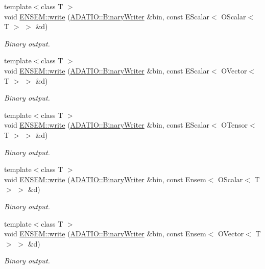 \begin{DoxyCompactItemize}
{\footnotesize template$<$class T $>$ }\\void \mbox{\hyperlink{namespaceENSEM_a0cbc421b6e399674cc0f2faf6ca73e9e}{E\+N\+S\+E\+M\+::write}} (\mbox{\hyperlink{classADATIO_1_1BinaryWriter}{A\+D\+A\+T\+I\+O\+::\+Binary\+Writer}} \&bin, const E\+Scalar$<$ O\+Scalar$<$ T $>$ $>$ \&d)
\begin{DoxyCompactList}\small\item\em Binary output. \end{DoxyCompactList}\item 
{\footnotesize template$<$class T $>$ }\\void \mbox{\hyperlink{namespaceENSEM_a50d31b905b65f0286fa9c7204b5a6b19}{E\+N\+S\+E\+M\+::write}} (\mbox{\hyperlink{classADATIO_1_1BinaryWriter}{A\+D\+A\+T\+I\+O\+::\+Binary\+Writer}} \&bin, const E\+Scalar$<$ O\+Vector$<$ T $>$ $>$ \&d)
\begin{DoxyCompactList}\small\item\em Binary output. \end{DoxyCompactList}\item 
{\footnotesize template$<$class T $>$ }\\void \mbox{\hyperlink{namespaceENSEM_aedacdfb4390e718c515314cad71d66ea}{E\+N\+S\+E\+M\+::write}} (\mbox{\hyperlink{classADATIO_1_1BinaryWriter}{A\+D\+A\+T\+I\+O\+::\+Binary\+Writer}} \&bin, const E\+Scalar$<$ O\+Tensor$<$ T $>$ $>$ \&d)
\begin{DoxyCompactList}\small\item\em Binary output. \end{DoxyCompactList}\item 
{\footnotesize template$<$class T $>$ }\\void \mbox{\hyperlink{namespaceENSEM_afee4cf5df7a009f056b6ea0bca81c639}{E\+N\+S\+E\+M\+::write}} (\mbox{\hyperlink{classADATIO_1_1BinaryWriter}{A\+D\+A\+T\+I\+O\+::\+Binary\+Writer}} \&bin, const Ensem$<$ O\+Scalar$<$ T $>$ $>$ \&d)
\begin{DoxyCompactList}\small\item\em Binary output. \end{DoxyCompactList}\item 
{\footnotesize template$<$class T $>$ }\\void \mbox{\hyperlink{namespaceENSEM_a08ef39649c7f1ffb49d89bb6dc416676}{E\+N\+S\+E\+M\+::write}} (\mbox{\hyperlink{classADATIO_1_1BinaryWriter}{A\+D\+A\+T\+I\+O\+::\+Binary\+Writer}} \&bin, const Ensem$<$ O\+Vector$<$ T $>$ $>$ \&d)
\begin{DoxyCompactList}\small\item\em Binary output. \end{DoxyCompactList}\item 

\end{DoxyCompactItemize}
